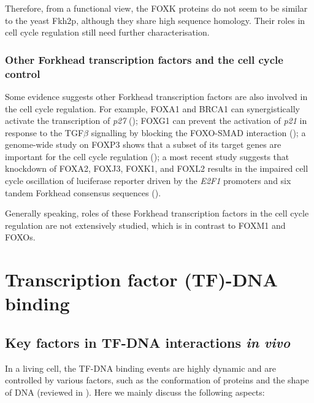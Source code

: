 Therefore, from a functional view, the FOXK proteins do not seem to be similar to the yeast Fkh2p, although they share high sequence homology. Their roles in cell cycle regulation still need further characterisation.

\subsubsection{Other Forkhead transcription factors and the cell cycle control}

Some evidence suggests other Forkhead transcription factors are also involved in the cell cycle regulation. For example, FOXA1 and BRCA1 can synergistically activate the transcription of \textit{p27} (\cite{williamson2006brca1}); FOXG1 can prevent the activation of \textit{p21} in response to the TGF$\beta$ signalling by blocking the FOXO-SMAD interaction (\cite{seoane2004integration}); a genome-wide study on FOXP3 shows that a subset of its target genes are important for the cell cycle regulation (\cite{katoh2011foxp3}); a most recent study suggests that knockdown of FOXA2, FOXJ3, FOXK1, and FOXL2 results in the impaired cell cycle oscillation of luciferase reporter driven by the \textit{E2F1} promoters and six tandem Forkhead consensus sequences (\cite{grant2012live-cell}).

Generally speaking, roles of these Forkhead transcription factors in the cell cycle regulation are not extensively studied, which is in contrast to FOXM1 and FOXOs.

\section{Transcription factor (TF)-DNA binding}

\subsection{Key factors in TF-DNA interactions \textit{in vivo}}

In a living cell, the TF-DNA binding events are highly dynamic and are controlled by various factors, such as the conformation of proteins and the shape of DNA (reviewed in \cite{garvie2001recognition,travers1989dna}). Here we mainly discuss the following aspects:

